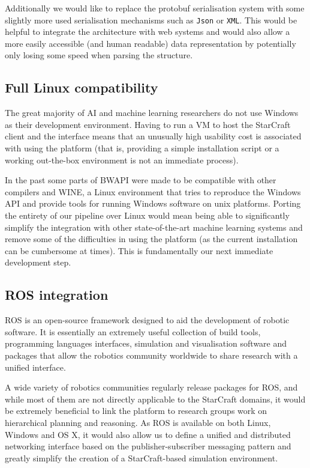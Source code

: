 Additionally we would like to replace the protobuf serialisation system with
some slightly more used serialisation mechanisms such as \texttt{Json} or
\texttt{XML}. This would be helpful to integrate the architecture with web
systems and would also allow a more easily accessible (and human readable) data
representation by potentially only losing some speed when parsing the structure.

\subsection{Full Linux compatibility}

The great majority of AI and machine learning researchers do not use Windows as
their development environment. Having to run a VM to host the StarCraft client
and the interface means that an unusually high usability cost is associated with
using the platform (that is, providing a simple installation script or a working
out-the-box environment is not an immediate process).

In the past some parts of BWAPI were made to be compatible with other compilers
and WINE, a Linux environment that tries to reproduce the Windows API and
provide tools for running Windows software on unix platforms. Porting the
entirety of our pipeline over Linux would mean being able to significantly
simplify the integration with other state-of-the-art machine learning systems
and remove some of the difficulties in using the platform (as the current
installation can be cumbersome at times). This is fundamentally our next
immediate development step.

\subsection{ROS integration}

ROS is an open-source framework designed to aid the development of robotic
software. It is essentially an extremely useful collection of build tools,
programming languages interfaces, simulation and visualisation software and
packages that allow the robotics community worldwide to share research with a
unified interface.

A wide variety of robotics communities regularly release packages for ROS, and
while most of them are not directly applicable to the StarCraft domains, it
would be extremely beneficial to link the platform to research groups work on
hierarchical planning and reasoning. As ROS is available on both Linux, Windows
and OS X, it would also allow us to define a unified and distributed networking
interface based on the publisher-subscriber messaging pattern and greatly
simplify the creation of a StarCraft-based simulation environment.


